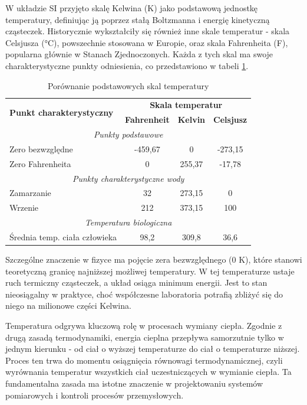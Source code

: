 \vspace{12pt}

W układzie SI przyjęto skalę Kelwina (K) jako podstawową jednostkę temperatury, definiując ją poprzez stałą Boltzmanna i energię kinetyczną cząsteczek. Historycznie wykształciły się również inne skale temperatur - skala Celsjusza (°C), powszechnie stosowana w Europie, oraz skala Fahrenheita (F), popularna głównie w Stanach Zjednoczonych. Każda z tych skal ma swoje charakterystyczne punkty odniesienia, co przedstawiono w tabeli \ref{tab:skale_temperatur}.

\vspace{12pt}

\begin{table}[h]
\centering
\begin{tabular}{|l|c|c|c|}
\hline
\multirow{2}{*}{\textbf{Punkt charakterystyczny}} & \multicolumn{3}{c|}{\textbf{Skala temperatur}} \\
\cline{2-4}
& \textbf{Fahrenheit} & \textbf{Kelvin} & \textbf{Celsjusz} \\
\hline
\multicolumn{4}{|c|}{\textit{Punkty podstawowe}} \\
\hline
Zero bezwzględne & -459,67 & 0 & -273,15 \\
Zero Fahrenheita & 0 & 255,37 & -17,78 \\
\hline
\multicolumn{4}{|c|}{\textit{Punkty charakterystyczne wody}} \\
\hline
Zamarzanie & 32 & 273,15 & 0 \\
Wrzenie & 212 & 373,15 & 100 \\
\hline
\multicolumn{4}{|c|}{\textit{Temperatura biologiczna}} \\
\hline
Średnia temp. ciała człowieka & 98,2 & 309,8 & 36,6 \\
\hline
\end{tabular}
\caption{Porównanie podstawowych skal temperatury}
\label{tab:skale_temperatur}
\end{table}

Szczególne znaczenie w fizyce ma pojęcie zera bezwzględnego (0 K), które stanowi teoretyczną granicę najniższej możliwej temperatury. W tej temperaturze ustaje ruch termiczny cząsteczek, a układ osiąga minimum energii. Jest to stan nieosiągalny w praktyce, choć współczesne laboratoria potrafią zbliżyć się do niego na milionowe części Kelwina.

\vspace{16pt}

Temperatura odgrywa kluczową rolę w procesach wymiany ciepła. Zgodnie z drugą zasadą termodynamiki, energia cieplna przepływa samorzutnie tylko w jednym kierunku - od ciał o wyższej temperaturze do ciał o temperaturze niższej. Proces ten trwa do momentu osiągnięcia równowagi termodynamicznej, czyli wyrównania temperatur wszystkich ciał uczestniczących w wymianie ciepła. Ta fundamentalna zasada ma istotne znaczenie w projektowaniu systemów pomiarowych i kontroli procesów przemysłowych.

